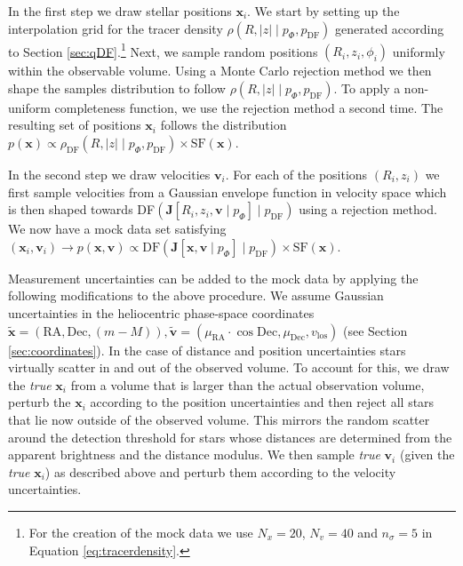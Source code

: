 \documentclass[iop,revtex4,numberedappendix,appendixfloats]{emulateapj}
\newcommand{\vect}[1]{\boldsymbol{#1}}
\begin{document}
In the first step we draw stellar positions $\vect{x}_i$. We start by setting up the interpolation grid for the tracer density $\rho(R,|z| \mid p_\Phi, p_\text{DF})$ generated according to Section \ref{sec:qDF}.\footnote{For the creation of the mock data we use $N_x = 20$, $N_v = 40$ and $n_\sigma=5$ in Equation \eqref{eq:tracerdensity}.} Next, we sample random positions $(R_i,z_i,\phi_i)$ uniformly within the observable volume. Using a Monte Carlo rejection method we then shape the samples distribution to follow $\rho(R,|z| \mid p_\Phi, p_\text{DF})$. To apply a non-uniform completeness function, we use the rejection method a second time. The resulting set of positions $\vect{x}_i$ follows the distribution $p(\vect{x}) \propto \rho_\text{DF}(R,|z| \mid p_{\Phi},p_\text{DF}) \times \text{SF}(\vect{x})$.

In the second step we draw velocities $\vect{v}_i$. For each of the positions $(R_i,z_i)$ we first sample velocities from a Gaussian envelope function in velocity space which is then shaped towards DF$(\vect{J}[R_i,z_i,\vect{v} \mid p_{\Phi}] \mid p_\text{DF})$ using a rejection method. We now have a mock data set satisfying $(\vect{x}_i,\vect{v}_i) \longrightarrow p(\vect{x},\vect{v}) \propto \text{DF}(\vect{J}[\vect{x},\vect{v} \mid p_{\Phi}] \mid p_\text{DF}) \times \text{SF}(\vect{x})$.

Measurement uncertainties can be added to the mock data by applying the following modifications to the above procedure. We assume Gaussian uncertainties in the heliocentric phase-space coordinates $\tilde{\vect{x}} = (\text{RA},\text{Dec},(m-M)), \tilde{\vect{v}} = (\mu_\text{RA} \cdot \cos \text{Dec} ,\mu_\text{Dec},v_\text{los})$ (see Section \ref{sec:coordinates}). In the case of distance and position uncertainties stars virtually scatter in and out of the observed volume. To account for this, we draw the \emph{true} $\vect{x}_i$ from a volume that is larger than the actual observation volume, perturb the $\vect{x}_i$ according to the position uncertainties and then reject all stars that lie now outside of the observed volume. This mirrors the random scatter around the detection threshold for stars whose distances are determined from the apparent brightness and the distance modulus. We then sample \emph{true} $\vect{v}_i$ (given the \emph{true} $\vect{x}_i$) as described above and perturb them according to the velocity uncertainties.
\end{document}
